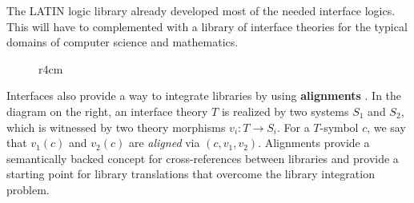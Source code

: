 The LATIN logic library already developed most of the needed interface logics.
This will have to complemented with a library of interface theories for the typical domains of computer science and mathematics.

\begin{figure}r{4cm}\vspace*{-1em}
  \vspace{-2em}
\end{figure}

Interfaces also provide a way to integrate libraries by using \textbf{alignments} \cite{RKS:integration:11}.
In the diagram on the right, an interface theory $T$ is realized by two systems $S_1$ and $S_2$, which is witnessed by two theory morphisms $v_i:T\to S_i$. For a $T$-symbol $c$, we say that $v_1(c)$ and $v_2(c)$ are \emph{aligned} via $(c,v_1,v_2)$.
Alignments provide a semantically backed concept for cross-references between libraries and provide a starting point for library translations that overcome the library integration problem.


%

